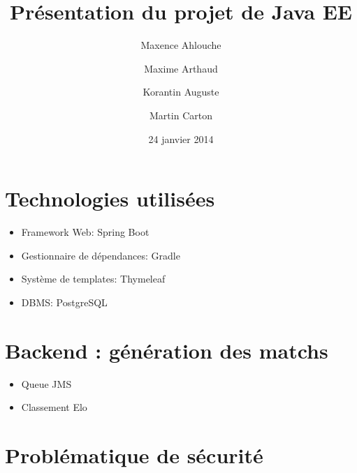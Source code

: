 \documentclass{beamer}
\title{Présentation du projet de Java EE}
\institute{Enseeiht}
\author
  [M.\ Ahlouche \and M.\ Arthaud \and K.\ Auguste \and M.\ Carton]
  {Maxence Ahlouche \and Maxime Arthaud \and Korantin Auguste \and Martin Carton}
\date{24 janvier 2014}
\begin{document}
\begin{frame}
  \titlepage
\end{frame}

\section{Technologies utilisées}
\begin{frame}
\begin{itemize}
  \item Framework Web: Spring Boot
  \item Gestionnaire de dépendances: Gradle
  \item Système de templates: Thymeleaf
  \item DBMS: PostgreSQL
\end{itemize}
\end{frame}

\section{Backend : génération des matchs}
\begin{frame}
\begin{itemize}
  \item Queue JMS
  \item Classement Elo
\end{itemize}
\end{frame}

\section{Problématique de sécurité}
\end{document}
